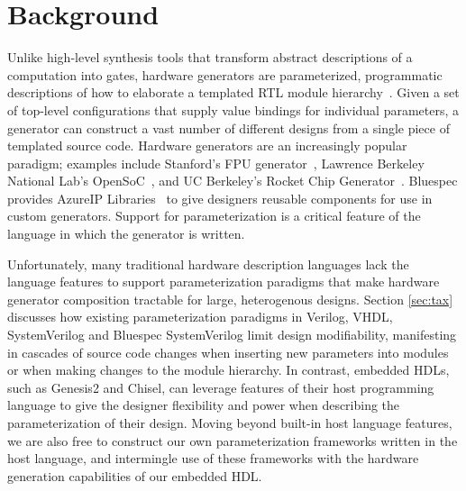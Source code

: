 \section{Background}
\label{sec:rel}

Unlike high-level synthesis tools that transform abstract descriptions of a computation into gates, hardware generators are parameterized, programmatic descriptions of how to elaborate a templated RTL module hierarchy~\cite{templates}.
Given a set of top-level configurations that supply value bindings for individual parameters, a generator can construct a vast number of different designs from a single piece of templated source code.
Hardware generators are an increasingly popular paradigm; examples include Stanford's FPU generator~\cite{fpu}, Lawrence Berkeley National Lab's OpenSoC~\cite{opensoc}, and UC Berkeley's Rocket Chip Generator~\cite{rocket}.
Bluespec provides AzureIP Libraries~\cite{azure} to give designers reusable components for use in custom generators. 
Support for parameterization is a critical feature of the language in which the generator is written.

Unfortunately, many traditional hardware description languages lack the language features to support parameterization paradigms that make hardware generator composition tractable for large, heterogenous designs.
Section \ref{sec:tax} discusses how existing parameterization paradigms in Verilog, VHDL, SystemVerilog and Bluespec SystemVerilog limit design modifiability, manifesting in cascades of source code changes when inserting new parameters into modules or when making changes to the module hierarchy.
In contrast, embedded HDLs, such as Genesis2\cite{genesis2} and Chisel\cite{chisel}, can leverage features of their host programming language to give the designer flexibility and power when describing the parameterization of their design.
Moving beyond built-in host language features, we are also free to construct our own parameterization frameworks written in the host language, and intermingle use of these frameworks with the hardware generation capabilities of our embedded HDL.


